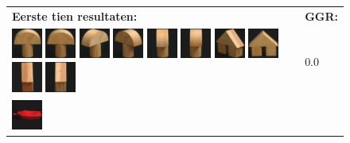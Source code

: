 \begin{figure}[tbp]
\begin{center}
\begin{tabular}{m{11cm} | m{3cm} |}
\textbf{Eerste tien resultaten:} & \textbf{GGR:} \\
\vspace{4pt}
\includegraphics[width=1cm]{coil/beeld-0.eps}
\includegraphics[width=1cm]{coil/beeld-1.eps}
\includegraphics[width=1cm]{coil/beeld-3.eps}
\includegraphics[width=1cm]{coil/beeld-4.eps}
\includegraphics[width=1cm]{coil/beeld-2.eps}
\includegraphics[width=1cm]{coil/beeld-5.eps}
\includegraphics[width=1cm]{coil/beeld-46.eps}
\includegraphics[width=1cm]{coil/beeld-42.eps}
\includegraphics[width=1cm]{coil/beeld-44.eps}
\includegraphics[width=1cm]{coil/beeld-47.eps}
& {\scriptsize 0.0}
\\
\includegraphics[width=1cm]{coil/beeld-18.eps}

\end{tabular}
\end{center}
\end{figure}
